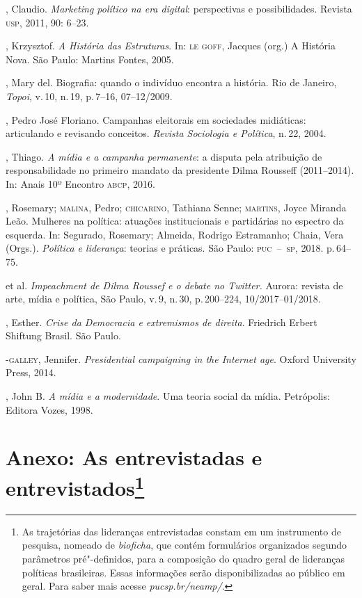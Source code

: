 \begin{bibliohedra}
, Claudio. \textit{Marketing político na era digital}:
perspectivas e possibilidades. Revista \textsc{usp}, 2011, 90: 6--23.

, Krzysztof. \textit{A História das Estruturas}. In: \textsc{le} \textsc{goff},
Jacques (org.) A História Nova. São Paulo: Martins Fontes, 2005.

, Mary del. Biografia: quando o indivíduo encontra a história. Rio
de Janeiro, \textit{Topoi}, v.\,10, n.\,19, p.\,7--16, 07--12/2009.

, Pedro José Floriano. Campanhas eleitorais em sociedades
midiáticas: articulando e revisando conceitos. \textit{Revista
Sociologia e Política}, n.\,22, 2004.

, Thiago. \textit{A mídia e a campanha permanente}: a disputa
pela atribuição de responsabilidade no primeiro mandato da presidente
Dilma Rousseff (2011--2014). In: Anais 10º Encontro \textsc{abcp}, 2016.

, Rosemary; \textsc{malina}, Pedro; \textsc{chicarino}, Tathiana Senne; \textsc{martins},
Joyce Miranda Leão. Mulheres na política: atuações institucionais e
partidárias no espectro da esquerda. In: Segurado, Rosemary; Almeida,
Rodrigo Estramanho; Chaia, Vera (Orgs.). \textit{Política e liderança}:
teorias e práticas. São Paulo: \textsc{puc~--~sp}, 2018. p.\,64--75.

\titidem\mbox{} et al. \textit{Impeachment de Dilma Roussef e o
debate no Twitter.} Aurora: revista de arte, mídia e política, São
Paulo, v.\,9, n.\,30, p.\,200--224, 10/2017--01/2018.

, Esther. \textit{Crise da Democracia e extremismos de direita}.
Friedrich Erbert Shiftung Brasil. São Paulo. 


-\textsc{galley}, Jennifer. \textit{Presidential campaigning in the
Internet age}. Oxford University Press, 2014.

, John B. \textit{A mídia e a modernidade}. Uma teoria social da
mídia. Petrópolis: Editora Vozes, 1998.


\section{Anexo: As entrevistadas e entrevistados\protect\footnote{As
  trajetórias das lideranças entrevistadas constam em um instrumento de
  pesquisa, nomeado de \textit{bioficha}, que contém formulários
  organizados segundo parâmetros pré"-definidos, para a composição do
  quadro geral de lideranças políticas brasileiras. Essas informações
  serão disponibilizadas ao público em geral. Para saber mais acesse
  \textit{pucsp.br/neamp/}.}}


\end{bibliohedra}
